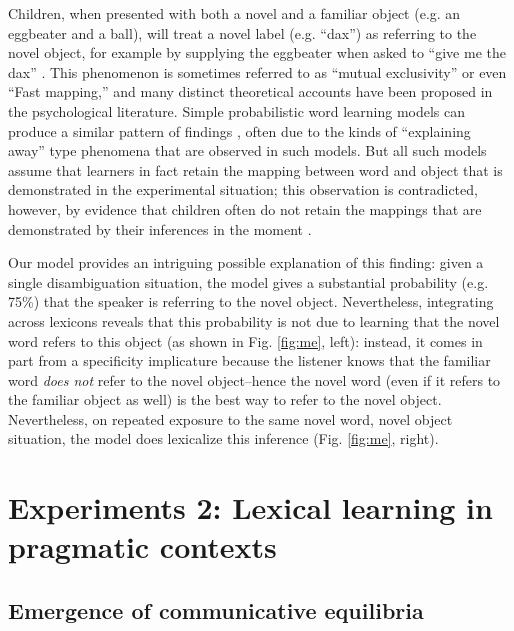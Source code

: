 \documentclass{article} %
\begin{document}
Children, when presented with both a novel and a familiar object (e.g. an eggbeater and a ball), will treat a novel label (e.g. ``dax'') as referring to the novel object, for example by supplying the eggbeater when asked to ``give me the dax'' \cite{markman1988}. This phenomenon is sometimes referred to as ``mutual exclusivity'' or even ``Fast mapping,'' and many distinct theoretical accounts have been proposed in the psychological literature. Simple probabilistic word learning models can produce a similar pattern of findings \cite{frank2009}, often due to the kinds of ``explaining away'' type phenomena that are observed in such models. But all such models assume that learners in fact retain the mapping between word and object that is demonstrated in the experimental situation; this observation is contradicted, however, by evidence that children often do not retain the mappings that are demonstrated by their inferences in the moment \cite{horst2008}. 

Our model provides an intriguing possible explanation of this finding: given a single disambiguation situation, the model gives a substantial probability (e.g. 75\%) that the speaker is referring to the novel object. Nevertheless, integrating across lexicons reveals that this probability is not due to learning that the novel word refers to this object (as shown in Fig. \ref{fig:me}, left): instead, it comes in part from a specificity implicature because the listener knows that the familiar word \emph{does not} refer to the novel object--hence the novel word (even if it refers to the familiar object as well) is the best way to refer to the novel object. Nevertheless, on repeated exposure to the same novel word, novel object situation, the model does lexicalize this inference (Fig. \ref{fig:me}, right). 


\section{Experiments 2: Lexical learning in pragmatic contexts}

\subsection{Emergence of communicative equilibria}
\end{document}
